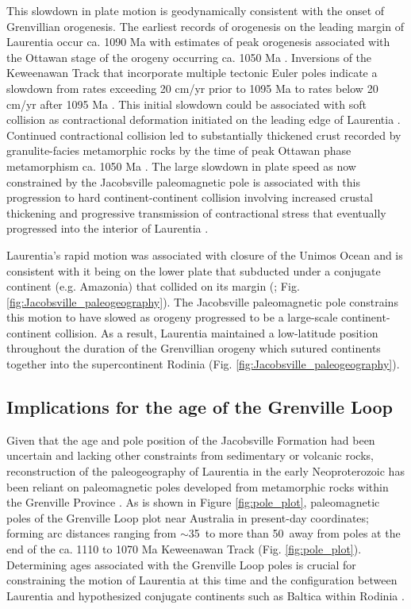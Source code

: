 This slowdown in plate motion is geodynamically consistent with the onset of Grenvillian orogenesis. The earliest records of orogenesis on the leading margin of Laurentia occur ca. 1090 Ma with estimates of peak orogenesis associated with the Ottawan stage of the orogeny occurring ca. 1050 Ma \citep{Rivers2012a, Swanson-Hysell2023a}. Inversions of the Keweenawan Track that incorporate multiple tectonic Euler poles indicate a slowdown from rates exceeding 20 cm/yr prior to 1095 Ma to rates below 20 cm/yr after 1095 Ma \citep{Swanson-Hysell2019a, Rose2022a}. This initial slowdown could be associated with soft collision as contractional deformation initiated on the leading edge of Laurentia \citep{Staal2020a}. Continued contractional collision led to substantially thickened crust recorded by granulite-facies metamorphic rocks by the time of peak Ottawan phase metamorphism ca. 1050 Ma \citep{Rivers2012a}. The large slowdown in plate speed as now constrained by the Jacobsville paleomagnetic pole is associated with this progression to hard continent-continent collision involving increased crustal thickening and progressive transmission of contractional stress that eventually progressed into the interior of Laurentia \citep{Cannon1994a}.

Laurentia's rapid motion was associated with closure of the Unimos Ocean and is consistent with it being on the lower plate that subducted under a conjugate continent (e.g. Amazonia) that collided on its margin (\citealp{Swanson-Hysell2023a}; Fig. \ref{fig:Jacobsville_paleogeography}). The Jacobsville paleomagnetic pole constrains this motion to have slowed as orogeny progressed to be a large-scale continent-continent collision. As a result, Laurentia maintained a low-latitude position throughout the duration of the Grenvillian orogeny which sutured continents together into the supercontinent Rodinia (Fig. \ref{fig:Jacobsville_paleogeography}). 

\subsection*{Implications for the age of the Grenville Loop}

Given that the age and pole position of the Jacobsville Formation had been uncertain and lacking other constraints from sedimentary or volcanic rocks, reconstruction of the paleogeography of Laurentia in the early Neoproterozoic has been reliant on paleomagnetic poles developed from metamorphic rocks within the Grenville Province \cite[e.g.][]{Weil1998a}. As is shown in Figure \ref{fig:pole_plot}, paleomagnetic poles of the Grenville Loop plot near Australia in present-day coordinates; forming arc distances ranging from $\sim$35\textdegree\ to more than 50\textdegree\ away from poles at the end of the ca. 1110 to 1070 Ma Keweenawan Track (Fig. \ref{fig:pole_plot}). Determining ages associated with the Grenville Loop poles is crucial for constraining the motion of Laurentia at this time and the configuration between Laurentia and hypothesized conjugate continents such as Baltica within Rodinia \citep{Cawood2017a, Gong2018a, Swanson-Hysell2021c}.

